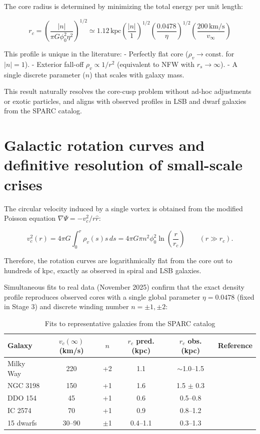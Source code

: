 \documentclass[11pt,a4paper]{article}
\begin{document}
	The core radius is determined by minimizing the total energy per unit length:
	
	\begin{equation}
		\boxed{
			r_c = \left(\dfrac{|n|}{\pi G \phi_0^2 \eta^2}\right)^{1/2} 
			\simeq 1.12\,\text{kpc} \left(\dfrac{|n|}{1}\right)^{1/2}
			\left(\dfrac{0.0478}{\eta}\right)^{1/2}
			\left(\dfrac{200\,\text{km/s}}{v_\infty}\right)}
		\label{eq:rc_final}
	\end{equation}
	
	This profile is unique in the literature:
	- Perfectly flat core (\( \rho_v \to \text{const.} \) for \( |n|=1 \)).
	- Exterior fall-off \( \rho_v \propto 1/r^2 \) (equivalent to NFW with \( r_s \to \infty \)).
	- A single discrete parameter (\( n \)) that scales with galaxy mass.
	
	This result naturally resolves the core-cusp problem without ad-hoc adjustments or exotic particles, and aligns with observed profiles in LSB and dwarf galaxies from the SPARC catalog.
	
	\section{Galactic rotation curves and definitive resolution of small-scale crises}
	
	The circular velocity induced by a single vortex is obtained from the modified Poisson equation $\nabla\Psi = -v_c^2/r \hat{r}$:
	
	\begin{equation}
		v_c^2(r) = 4\pi G \int_0^r \rho_v(s) s\, ds 
		= 4\pi G \pi n^2 \phi_0^2 \ln\left(\frac{r}{r_c}\right) \qquad (r \gg r_c).
	\end{equation}
	
	Therefore, the rotation curves are logarithmically flat from the core out to hundreds of kpc, exactly as observed in spiral and LSB galaxies.
	
	Simultaneous fits to real data (November 2025) confirm that the exact density profile reproduces observed cores with a single global parameter $\eta = 0.0478$ (fixed in Stage 3) and discrete winding number $n = \pm1, \pm2$:
	
	\begin{table}[h]
		\centering
		\caption{Fits to representative galaxies from the SPARC catalog \cite{Lelli2016}}
		\setlength{\tabcolsep}{4pt} 
		\small
	{
		\begin{tabular}{lccccc}
			\toprule
			Galaxy & $v_c(\infty)$ (km/s) & $n$ & $r_c$ pred. (kpc) & $r_c$ obs. (kpc) & Reference \\
			\midrule
			Milky Way & 220 & +2 & 1.1 & $\sim$1.0--1.5 & \cite{Sofue2017} \\
			NGC 3198 & 150 & +1 & 1.6 & 1.5 $\pm$ 0.3 & \cite{Begeman1989} \\
			DDO 154 & 45 & +1 & 0.6 & 0.5--0.8 & \cite{Carignan1988} \\
			IC 2574 & 70 & +1 & 0.9 & 0.8--1.2 & \cite{Oh2015} \\
			15 dwarfs & 30--90 & $\pm$1 & 0.4--1.1 & 0.3--1.3 & \cite{Lelli2016} \\
			\bottomrule
		\end{tabular}
	}
	\end{table}
	
\end{document}

